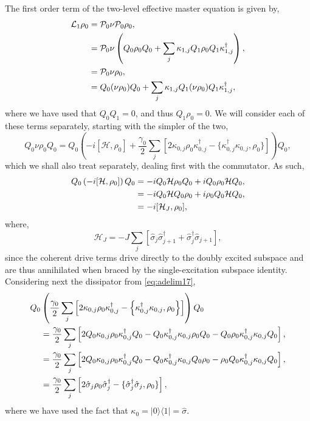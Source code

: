 The first order term of the two-level effective master equation is given by,
\begin{align}
	\mathcal{L}_{1}\rho_{0} &= \mathcal{P}_{0}\nu\mathcal{P}_{0}\rho_{0}, \notag \\
	&= \mathcal{P}_{0}\nu\left( Q_{0}\rho_{0}Q_{0} + \sum_{j}\kappa_{1,j}Q_{1}\rho_{0}Q_{1}\kappa_{1,j}^{\dagger} \right), \notag \\
	&= \mathcal{P}_{0}\nu\rho_{0}, \notag \\
	&= Q_{0}(\nu\rho_{0})Q_{0} + \sum_{j}\kappa_{1,j}Q_{1}(\nu\rho_{0})Q_{1}\kappa_{1,j}^{\dagger},
	\label{eq:adelim16}
\end{align}
where we have used that \(Q_{0}Q_{1} = 0\), and thus \(Q_{1}\rho_{0} = 0\). We will consider each of these terms separately, starting with the simpler of the two,
\begin{equation}
	Q_{0}\nu\rho_{0}Q_{0} = Q_{0} \left( -i\left[\mathcal{H}, \rho_{0}\right] + \frac{\gamma_{0}}{2} \sum_{j}\left[ 2\kappa_{0,j}\rho_{0}\kappa_{0,j}^{\dagger} - \{\kappa_{0,j}^{\dagger}\kappa_{0,j}, \rho_{0}\} \right] \right) Q_{0},
	\label{eq:adelim17}
\end{equation}
which we shall also treat separately, dealing first with the commutator. As such,
\begin{align}
	Q_{0} \left( -i[\mathcal{H}, \rho_{0}] \right) Q_{0} &= -iQ_{0}\mathcal{H}\rho_{0}Q_{0} + iQ_{0}\rho_{0}\mathcal{H}Q_{0}, \notag \\
	&= -iQ_{0}\mathcal{H}Q_{0}\rho_{0} + i\rho_{0} Q_{0}\mathcal{H}Q_{0}, \notag \\
	&= -i[\mathcal{H}_{J}, \rho_{0}],
	\label{eq:adelim18}
\end{align}
where,
\begin{equation}
	\mathcal{H}_{J} = -J\sum_{j} \left[ \hat{\sigma}_{j}\hat{\sigma}_{j+1}^{\dagger} + \hat{\sigma}_{j}^{\dagger}\hat{\sigma}_{j+1}\right],
	\label{eq:adelim19}
\end{equation}
since the coherent drive terms drive directly to the doubly excited subspace and are thus annihilated when braced by the single-excitation subspace identity. Considering next the dissipator from \cref{eq:adelim17},
\begin{align}
	Q_{0}&\left( \frac{\gamma_{0}}{2}\sum_{j}\left[2\kappa_{0,j}\rho_{0}\kappa_{0,j}^{\dagger} - \left\{ \kappa_{0,j}^{\dagger}\kappa_{0,j}, \rho_{0}\right\} \right] \right)Q_{0} \notag \\
	&= \frac{\gamma_{0}}{2} \sum_{j} \left[2Q_{0}\kappa_{0,j}\rho_{0}\kappa_{0,j}^{\dagger}Q_{0} - Q_{0}\kappa_{0,j}^{\dagger}\kappa_{0,j}\rho_{0}Q_{0} - Q_{0}\rho_{0}\kappa_{0,j}^{\dagger}\kappa_{0,j}Q_{0} \right], \notag \\
	&= \frac{\gamma_{0}}{2} \sum_{j} \left[2Q_{0}\kappa_{0,j}\rho_{0}\kappa_{0,j}^{\dagger}Q_{0} - Q_{0}\kappa_{0,j}^{\dagger}\kappa_{0,j}Q_{0}\rho_{0} - \rho_{0}Q_{0}\kappa_{0,j}^{\dagger}\kappa_{0,j}Q_{0} \right], \notag \\
	&= \frac{\gamma_{0}}{2} \sum_{j} \left[2\hat{\sigma}_{j}\rho_{0}\hat{\sigma}_{j}^{\dagger} - \{\hat{\sigma}_{j}^{\dagger}\hat{\sigma}_{j}, \rho_{0}\}\right],
	\label{eq:adelim20}
\end{align}
where we have used the fact that \(\kappa_{0} = |0\rangle \langle 1| = \hat{\sigma}\).

